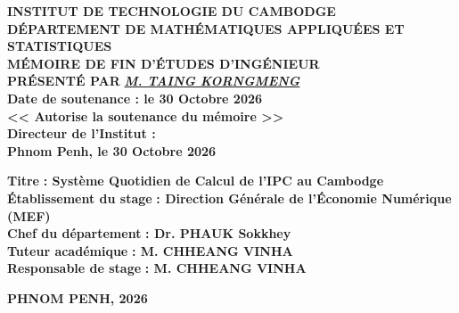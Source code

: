 \begin{center}
    \vspace{-.2cm}
    \fontsize{14pt}{16pt}\selectfont \textbf{INSTITUT DE TECHNOLOGIE DU CAMBODGE} \\[.3cm]
    \fontsize{13pt}{15pt}\selectfont \textbf{DÉPARTEMENT DE MATHÉMATIQUES APPLIQUÉES ET STATISTIQUES} \\[0.8cm]
    
    \fontsize{15pt}{14pt}\selectfont \textbf{MÉMOIRE DE FIN D'ÉTUDES D'INGÉNIEUR} \\[0.4cm] 
    \textbf{PRÉSENTÉ PAR} \emph{\href{mailto:e20220603@itc.edu.kh}{\textbf{M. TAING KORNGMENG}}} \\[0.8cm] 
    
    \fontsize{13pt}{14pt}\selectfont \textbf{Date de soutenance : le 30 Octobre 2026} \\[0.8cm]

    \fontsize{13pt}{14pt}\selectfont \textbf{<< Autorise la soutenance du mémoire >>} \\[0.8cm]

    \fontsize{12pt}{14pt}\selectfont \textbf{Directeur de l'Institut :} \underline{\hspace{4.5cm}} \\[0.8cm]

    \fontsize{12pt}{14pt}\selectfont \textbf{Phnom Penh, le 30 Octobre 2026} \\[1.2cm]
    
    \begin{flushleft}
        \fontsize{11pt}{14pt}\selectfont \textbf{Titre} \hspace{3.4cm} \textbf{: Système Quotidien de Calcul de l'IPC au Cambodge} \\[0.4cm] 
        \fontsize{11pt}{14pt}\selectfont \textbf{Établissement du stage} \hspace{0.15cm} \textbf{: Direction Générale de l'Économie Numérique (MEF)} \\[0.4cm]
        \fontsize{11pt}{14pt}\selectfont \textbf{Chef du département} \hspace{0.95cm} \textbf{: Dr. PHAUK Sokkhey}
        \underline{\hspace{3.5cm}}\\[0.4cm]
        \fontsize{11pt}{14pt}\selectfont \textbf{Tuteur académique} \hspace{1.15cm} \textbf{: M. CHHEANG VINHA}
        \underline{\hspace{3.5cm}}\\[0.4cm]
        \fontsize{11pt}{14pt}\selectfont \textbf{Responsable de stage} \hspace{0.65cm} \textbf{: M. CHHEANG VINHA}
        \underline{\hspace{3.5cm}}\\[1cm]
    \end{flushleft}

    \fontsize{13pt}{14pt}\selectfont \textbf{PHNOM PENH, 2026}

\end{center}